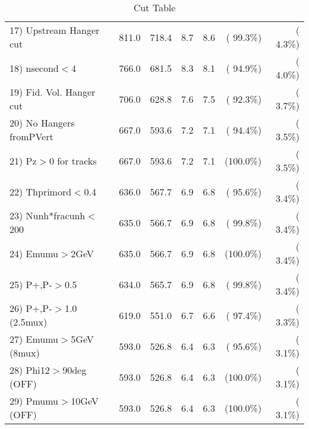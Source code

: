\begin{table}[h!]
\begin{tabular}{||l||r|r|r|r|r|r||}
 17) Upstream Hanger cut  &        811.0 &        718.4 &          8.7 &          8.6 & ( 99.3\%) & (  4.3\%) \\
 18) nsecond$<$4          &        766.0 &        681.5 &          8.3 &          8.1 & ( 94.9\%) & (  4.0\%) \\
 19) Fid. Vol. Hanger cut &        706.0 &        628.8 &          7.6 &          7.5 & ( 92.3\%) & (  3.7\%) \\
 20) No Hangers fromPVert &        667.0 &        593.6 &          7.2 &          7.1 & ( 94.4\%) & (  3.5\%) \\
 21) Pz$>$0 for tracks    &        667.0 &        593.6 &          7.2 &          7.1 & (100.0\%) & (  3.5\%) \\
 22) Thprimord$<$0.4      &        636.0 &        567.7 &          6.9 &          6.8 & ( 95.6\%) & (  3.4\%) \\
 23) Nunh*fracunh$<$200   &        635.0 &        566.7 &          6.9 &          6.8 & ( 99.8\%) & (  3.4\%) \\
 24) Emumu$>$2GeV         &        635.0 &        566.7 &          6.9 &          6.8 & (100.0\%) & (  3.4\%) \\
 25) P+,P-$>$0.5          &        634.0 &        565.7 &          6.9 &          6.8 & ( 99.8\%) & (  3.4\%) \\
 26) P+,P-$>$1.0 (2.5mux) &        619.0 &        551.0 &          6.7 &          6.6 & ( 97.4\%) & (  3.3\%) \\
 27) Emumu$>$5GeV  (8mux) &        593.0 &        526.8 &          6.4 &          6.3 & ( 95.6\%) & (  3.1\%) \\
 28) Phi12$>$90deg  (OFF) &        593.0 &        526.8 &          6.4 &          6.3 & (100.0\%) & (  3.1\%) \\
 29) Pmumu$>$10GeV  (OFF) &        593.0 &        526.8 &          6.4 &          6.3 & (100.0\%) & (  3.1\%) \\
 \hline
 \hline
 \end{tabular}
 \caption{Cut Table           }
 \label{tab-cutcohjpsi-mumu_cohpip}
 \end{table}
